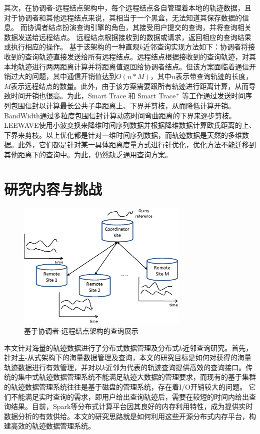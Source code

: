         
        其次，在协调者-远程结点架构中，每个远程结点各自管理着本地的轨迹数据，且对于协调者和其他远程结点来说，其相当于一个黑盒，无法知道其保存数据的信息。
        而协调者结点扮演查询引擎的角色，其接受用户提交的查询，并将查询相关数据发送给远程结点。
        远程结点根据接收到的数据或请求，返回相应的查询结果或执行相应的操作。
        基于该架构的一种直观$k$近邻查询实现方法如下：协调者将接收到的查询轨迹直接发送给所有远程结点。远程结点根据接收到的查询轨迹，对其本地轨迹进行两两距离计算并将距离值返回给协调者结点。但该方案面临着通信开销过大的问题，其中通信开销值达到$O(n*M)$，其中$n$表示带查询轨迹的长度，$M$表示远程结点的数量。此外，由于该方案需要跟所有轨迹进行距离计算，从而导致时间开销也很高。为此，Smart Trace\cite{SmartTrace} 和 Smart Trace$^{+}$ \cite{crowdsourced} 等工作通过发送时间序列包围信封以计算最长公共子串距离上、下界并剪枝，从而降低计算开销。BandWidth\cite{bandwidth}通过多粒度包围信封计算动态时间弯曲距离的下界来逐步剪枝。
        LEEWAVE\cite{LeeWave}使用小波变换来降维时间序列数据并根据降维数据计算欧氏距离的上、下界来剪枝。以上优化都是针对一维时间序列数据，而轨迹数据是天然的多维数据。此外，它们都是针对某一具体距离度量方式进行针优化，优化方法不能迁移到其他距离下的查询中。为此，仍然缺乏通用查询方案。
                    

\section{研究内容与挑战}\label{sec-c1-content}
\begin{figure}
	\centering
	\includegraphics[width=0.73\textwidth]{Fig/chapter1/coor-remote}
	\caption{基于协调者-远程结点架构的查询展示}
	\label{fig-chapter1-demonstrate}
\end{figure}

本文针对海量的轨迹数据进行了分布式数据管理及分布式$k$近邻查询研究。首先，针对主-从式架构下的海量数据管理及查询，本文的研究目标是如何对获得的海量轨迹数据进行有效管理，并对以$k$近邻为代表的轨迹查询提供高效的查询接口。传统的集中式轨迹数据管理系统不能满足轨迹大数据的管理要求，而现有的基于集群的轨迹数据管理系统往往是基于磁盘的管理系统，存在着I/O开销较大的问题。
它们不能满足实时查询的需求，即用户给出查询轨迹后，需要在较短的时间内给出查询结果。目前，Spark等分布式计算平台因其良好的内存利用特性，成为提供实时数据分析的有效供给。本文的研究思路就是如何利用这些开源分布式内存平台，构建高效的轨迹数据管理系统。

